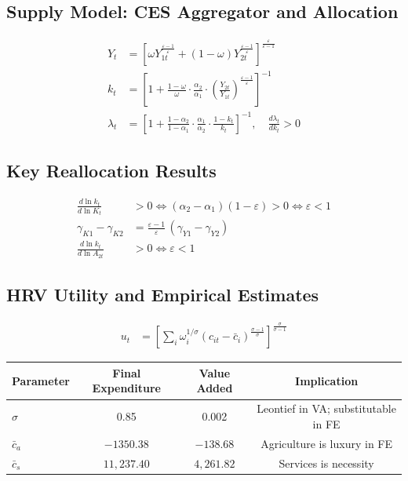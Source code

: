 \documentclass[a4paper,11pt]{article}
\begin{document}
\subsection*{Supply Model: CES Aggregator and Allocation}
\begin{align*}
Y_t &= \left[\omega Y_{1t}^{\frac{\varepsilon-1}{\varepsilon}} + (1-\omega) Y_{2t}^{\frac{\varepsilon-1}{\varepsilon}}\right]^{\frac{\varepsilon}{\varepsilon-1}} \tag{CES}\\
k_t &= \left[1 + \frac{1-\omega}{\omega} \cdot \frac{\alpha_2}{\alpha_1} \cdot \left(\frac{Y_{2t}}{Y_{1t}}\right)^{\!\frac{\varepsilon-1}{\varepsilon}}\right]^{-1} \tag{Capital Allocation}\\
\lambda_t &= \left[1 + \frac{1-\alpha_2}{1-\alpha_1} \cdot \frac{\alpha_1}{\alpha_2} \cdot \frac{1-k_t}{k_t}\right]^{-1}, \quad \frac{d\lambda_t}{dk_t} > 0 \tag{Labor Allocation}
\end{align*}

\subsection*{Key Reallocation Results}
\begin{align*}
\frac{d\ln k_t}{d\ln K_t} &> 0 \iff (\alpha_2 - \alpha_1)(1 - \varepsilon) > 0 \iff \varepsilon < 1 \tag{Capital Direction}\\
\gamma_{K1} - \gamma_{K2} &= \frac{\varepsilon-1}{\varepsilon}\,(\gamma_{Y1} - \gamma_{Y2}) \tag{Baumol}\\
\frac{d\ln k_t}{d\ln A_{2t}} &> 0 \iff \varepsilon < 1 \tag{TFP Channel}
\end{align*}

\subsection*{HRV Utility and Empirical Estimates}
\begin{align*}
u_t &= \left[\sum_{i} \omega_i^{1/\sigma}(c_{it} - \bar{c}_i)^{\frac{\sigma-1}{\sigma}}\right]^{\frac{\sigma}{\sigma-1}} \tag{HRV}
\end{align*}

\begin{center}
\begin{tabular}{lccc}
\toprule
\textbf{Parameter} & \textbf{Final Expenditure} & \textbf{Value Added} & \textbf{Implication} \\
\midrule
$\sigma$ & 0.85 & 0.002 & Leontief in VA; substitutable in FE \\
$\bar{c}_a$ & $-1350.38$ & $-138.68$ & Agriculture is luxury in FE \\
$\bar{c}_s$ & $11{,}237.40$ & $4{,}261.82$ & Services is necessity \\
\bottomrule
\end{tabular}
\end{center}
\end{document}
